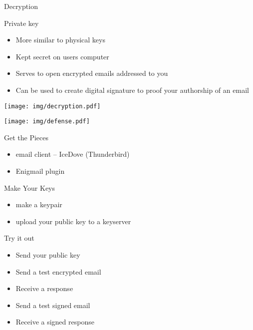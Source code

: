 \documentclass{beamer}
\begin{document}
\begin{frame}{Decryption}
  \begin{minipage}{0.69\linewidth}
    Private key
    \begin{itemize}
    \item More similar to physical keys
    \item Kept secret on users computer
    \item Serves to open encrypted emails addressed to you
    \item Can be used to create digital signature to proof your authorship of an email
    \end{itemize}
  \end{minipage}
%
  \begin{minipage}{0.29\linewidth}
    \texttt{[image: img/decryption.pdf]}
  \end{minipage}
\end{frame}

\begin{frame}
  \begin{center}
    \texttt{[image: img/defense.pdf]}
  \end{center}

\end{frame}

\begin{frame}{Get the Pieces}
  \begin{itemize}
  \item email client -- IceDove (Thunderbird)
  \item Enigmail plugin
  \end{itemize}
\end{frame}

\begin{frame}{Make Your Keys}
  \begin{itemize}
  \item make a keypair
  \item upload your public key to a keyserver
  \end{itemize}
\end{frame}

\begin{frame}{Try it out}
  \begin{itemize}
  \item Send your public key
  \item Send a test encrypted email
  \item Receive a response
  \item Send a test signed email
  \item Receive a signed response
  \end{itemize}
\end{frame}
\end{document}
